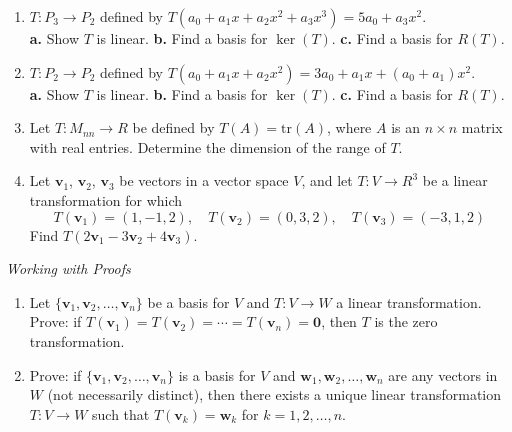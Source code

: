 \documentclass{article}
\begin{document}
\begin{enumerate}
  \item[27.] $T : P_3 \to P_2$ defined by
        $T(a_0+a_1x+a_2x^2+a_3x^3) = 5a_0 + a_3x^2$.\\
        \textbf{a.} Show $T$ is linear. \quad
        \textbf{b.} Find a basis for $\ker(T)$. \quad
        \textbf{c.} Find a basis for $R(T)$.

  \item[28.] $T : P_2 \to P_2$ defined by
        $T(a_0+a_1x+a_2x^2) = 3a_0+a_1x+(a_0+a_1)x^2$.\\
        \textbf{a.} Show $T$ is linear. \quad
        \textbf{b.} Find a basis for $\ker(T)$. \quad
        \textbf{c.} Find a basis for $R(T)$.

  \item[32.] Let $T : M_{nn} \to R$ be defined by $T(A) = \mathrm{tr}(A)$, where $A$ is
        an $n\times n$ matrix with real entries.
        Determine the dimension of the range of $T$.

  \item[35.] Let $\mathbf{v}_1$, $\mathbf{v}_2$, $\mathbf{v}_3$ be vectors in a vector space
        $V$, and let $T : V \to R^3$ be a linear transformation for which
        \[
          T(\mathbf{v}_1)=(1,-1,2),\quad T(\mathbf{v}_2)=(0,3,2),\quad T(\mathbf{v}_3)=(-3,1,2)
        \]
        Find $T(2\mathbf{v}_1-3\mathbf{v}_2+4\mathbf{v}_3)$.

\end{enumerate}

\noindent\textit{Working with Proofs}

\begin{enumerate}
  \item[36.] Let $\{\mathbf{v}_1,\mathbf{v}_2,\ldots,\mathbf{v}_n\}$ be a basis for $V$ and
        $T : V \to W$ a linear transformation. Prove: if $T(\mathbf{v}_1)=T(\mathbf{v}_2)
        =\cdots=T(\mathbf{v}_n)=\mathbf{0}$, then $T$ is the zero transformation.

  \item[38.] Prove: if $\{\mathbf{v}_1,\mathbf{v}_2,\ldots,\mathbf{v}_n\}$ is a basis for $V$
        and $\mathbf{w}_1,\mathbf{w}_2,\ldots,\mathbf{w}_n$ are any vectors in $W$
        (not necessarily distinct), then there exists a unique linear transformation
        $T : V \to W$ such that $T(\mathbf{v}_k)=\mathbf{w}_k$ for $k=1,2,\ldots,n$.

\end{enumerate}
\end{document}
